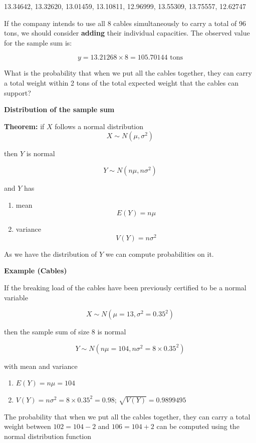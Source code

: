 \documentclass[
]{book}
\providecommand{\tightlist}{%
  \setlength{\itemsep}{0pt}\setlength{\parskip}{0pt}}
\begin{document}
13.34642, 13.32620, 13.01459, 13.10811, 12.96999, 13.55309, 13.75557, 12.62747

If the company intends to use all 8 cables simultaneously to carry a total of 96 tons, we should consider \textbf{adding} their individual capacities. The observed value for the sample sum is:

\[
y = 13.21268 \times 8 = 105.70144 \text{ tons}
\]

What is the probability that when we put all the cables together, they can carry a total weight within 2 tons of the total expected weight that the cables can support?

\textbf{Distribution of the sample sum}

\textbf{Theorem:} if \(X\) follows a normal distribution
\[X \sim N(\mu, \sigma^2)\]

then \(Y\) is normal

\[Y \sim N(n\mu, n\sigma^2)\]

and \(Y\) has

\begin{enumerate}
\def\labelenumi{\arabic{enumi})}
\tightlist
\item
  mean \[E(Y)=n\mu\]
\item
  variance \[V(Y)=n\sigma^2\]
\end{enumerate}

As we have the distribution of \(Y\) we can compute probabilities on it.

\textbf{Example (Cables)}

If the breaking load of the cables have been previously certified to be a normal variable

\[X \sim N(\mu=13, \sigma^2=0.35^2)\]

then the sample sum of size \(8\) is normal

\[Y \sim N(n\mu=104, n\sigma^2=8\times 0.35^2)\]

with mean and variance

\begin{enumerate}
\def\labelenumi{\arabic{enumi})}
\tightlist
\item
  \(E(Y)=n\mu=104\)
\item
  \(V(Y)=n\sigma^2=8\times 0.35^2=0.98\); \(\sqrt{V(Y)}=0.9899495\)
\end{enumerate}

The probability that when we put all the cables together, they can carry a total weight between \(102=104-2\) and \(106=104+2\) can be computed using the normal distribution function
\end{document}
